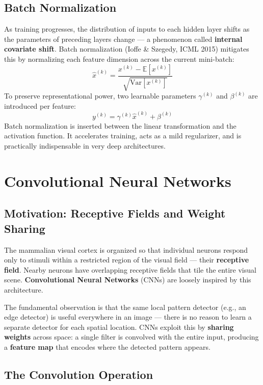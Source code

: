 \documentclass[11pt,a4paper]{article}
\theoremstyle{definition}
\theoremstyle{plain}
\theoremstyle{remark}
\begin{document}
\subsection{Batch Normalization}

As training progresses, the distribution of inputs to each hidden layer shifts as the parameters of preceding layers change --- a phenomenon called \textbf{internal covariate shift}. Batch normalization (Ioffe \& Szegedy, ICML 2015) mitigates this by normalizing each feature dimension across the current mini-batch:
\[
    \hat{x}^{(k)} = \frac{x^{(k)} - \mathbb{E}[x^{(k)}]}{\sqrt{\mathrm{Var}[x^{(k)}]}}
\]
To preserve representational power, two learnable parameters $\gamma^{(k)}$ and $\beta^{(k)}$ are introduced per feature:
\[
    y^{(k)} = \gamma^{(k)}\hat{x}^{(k)} + \beta^{(k)}
\]
Batch normalization is inserted between the linear transformation and the activation function. It accelerates training, acts as a mild regularizer, and is practically indispensable in very deep architectures.


\section{Convolutional Neural Networks}

\subsection{Motivation: Receptive Fields and Weight Sharing}

The mammalian visual cortex is organized so that individual neurons respond only to stimuli within a restricted region of the visual field --- their \textbf{receptive field}. Nearby neurons have overlapping receptive fields that tile the entire visual scene. \textbf{Convolutional Neural Networks} (CNNs) are loosely inspired by this architecture.

The fundamental observation is that the same local pattern detector (e.g., an edge detector) is useful everywhere in an image --- there is no reason to learn a separate detector for each spatial location. CNNs exploit this by \textbf{sharing weights} across space: a single filter is convolved with the entire input, producing a \textbf{feature map} that encodes where the detected pattern appears.

\subsection{The Convolution Operation}
\end{document}
